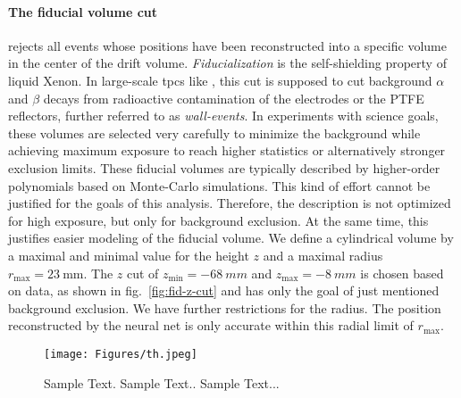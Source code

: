 \paragraph{The fiducial volume cut} rejects all events whose positions have been reconstructed into a specific volume in the center of the drift volume.
\emph{Fiducialization} is the self-shielding property of liquid Xenon.
In large-scale \glspl{tpc} like \nton, this cut is supposed to cut background $\alpha$ and $\beta$ decays from radioactive contamination of the electrodes or the PTFE reflectors, further referred to as \emph{wall-events}.
In experiments with science goals, these volumes are selected very carefully to minimize the background while achieving maximum exposure to reach higher statistics or alternatively stronger exclusion limits.  %
These fiducial volumes are typically described by higher-order polynomials based on Monte-Carlo simulations. %
This kind of effort cannot be justified for the goals of this analysis.
Therefore, the description is not optimized for high exposure, but only for background exclusion.
At the same time, this justifies easier modeling of the fiducial volume.
We define a cylindrical volume by a maximal and minimal value for the height $z$ and a maximal radius $r_\mathrm{max} = \SI{23}{\milli\m}$.
The $z$ cut of $ z_\mathrm{min} = \SI{-68}{mm} $ and $ z_\mathrm{max} = \SI{-8}{mm} $ is chosen based on data, as shown in fig.~\ref{fig:fid-z-cut} and has only the goal of just mentioned background exclusion. We have further restrictions for the radius.
The position reconstructed by the neural net is only accurate within this radial limit of $r_\mathrm{max}$\cite{ABism}.


\begin{figure}[H]
\centering
\texttt{[image: Figures/th.jpeg]}  %
\caption[Area-Width Histogram smaller S1 after Fid. Cut]{
        Sample Text.
        Sample Text..
        Sample Text...
    }
\label{fig:other_s1_area_width}
\end{figure}


